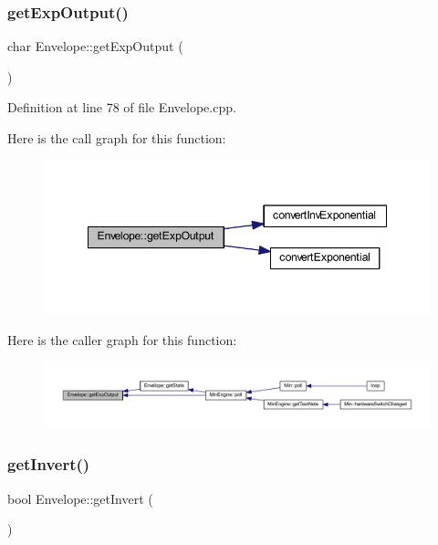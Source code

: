 \subsubsection{\texorpdfstring{get\+Exp\+Output()}{getExpOutput()}}
{\footnotesize\ttfamily char Envelope\+::get\+Exp\+Output (\begin{DoxyParamCaption}{ }\end{DoxyParamCaption})}



Definition at line 78 of file Envelope.\+cpp.

Here is the call graph for this function\+:
\nopagebreak
\begin{figure}[H]
\begin{center}
\leavevmode
\includegraphics[width=348pt]{class_envelope_a84eaf76b6ef7fbd2d394fba1f59cb909_cgraph}
\end{center}
\end{figure}
Here is the caller graph for this function\+:
\nopagebreak
\begin{figure}[H]
\begin{center}
\leavevmode
\includegraphics[width=350pt]{class_envelope_a84eaf76b6ef7fbd2d394fba1f59cb909_icgraph}
\end{center}
\end{figure}
\mbox{\label{class_envelope_a90c62a0768be44808c1a1ea731ff1f7c}} 
\subsubsection{\texorpdfstring{get\+Invert()}{getInvert()}}
{\footnotesize\ttfamily bool Envelope\+::get\+Invert (\begin{DoxyParamCaption}{ }\end{DoxyParamCaption})\hspace{0.3cm}{\ttfamily [inline]}}



